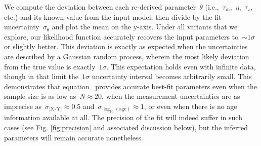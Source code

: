 \documentclass[foo.tex]{subfiles}
\begin{document}
We compute the deviation between each re-derived parameter~$\theta$
(i.e.,~$\tau_\text{in}$,~$\eta$,~$\tau_\star$, etc.) and its known value from
the input model, then divide by the fit uncertainty~$\sigma_\theta$ and plot
the mean on the y-axis.
Under all variants that we explore, our likelihood function accurately recovers
the input parameters to~$\sim1\sigma$ or slightly better.
This deviation is exactly as expected when the uncertainties are described by a
Gaussian random process, wherein the most likely deviation from the true value
is exactly~$1\sigma$.
This expectation holds even with infinite data, though in that limit
the~$1\sigma$ uncertainty interval becomes arbitrarily small.
This demonstrates that equation~ provides accurate best-fit
parameters even when the sample size is as low as~$N \approx 20$, when the
measurement uncertainties are as imprecise as~$\sigma_\text{[X/Y]} \approx 0.5$
and~$\sigma_{\log_{10}(\text{age})} \approx 1$, or even when there is no age
information available at all.
The precision of the fit will indeed suffer in such cases (see Fig.
\ref{fig:precision} and associated discussion below), but the inferred
parameters will remain accurate nonetheless.
\end{document}
